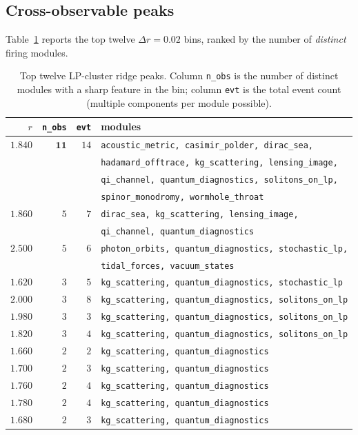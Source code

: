 \documentclass[11pt,letterpaper]{article}
\begin{document}
\subsection{Cross-observable peaks}\label{ssec:peaks}

Table~\ref{tab:peaks} reports the top twelve $\Delta r = 0.02$ bins, ranked by the number of \emph{distinct} firing modules.

\begin{table}[h]
\centering
\caption{Top twelve LP-cluster ridge peaks. Column \texttt{n\_obs} is the number of distinct modules with a sharp feature in the bin; column \texttt{evt} is the total event count (multiple components per module possible).}
\label{tab:peaks}
\begin{tabular}{rrrl}
\toprule
$r$ & \texttt{n\_obs} & \texttt{evt} & modules \\
\midrule
$1.840$ & $\mathbf{11}$ & $14$ & \texttt{acoustic\_metric, casimir\_polder, dirac\_sea,} \\
       &     &     & \texttt{hadamard\_offtrace, kg\_scattering, lensing\_image,} \\
       &     &     & \texttt{qi\_channel, quantum\_diagnostics, solitons\_on\_lp,} \\
       &     &     & \texttt{spinor\_monodromy, wormhole\_throat} \\
\midrule
$1.860$ & $5$ & $7$ & \texttt{dirac\_sea, kg\_scattering, lensing\_image,} \\
       &     &     & \texttt{qi\_channel, quantum\_diagnostics} \\
$2.500$ & $5$ & $6$ & \texttt{photon\_orbits, quantum\_diagnostics, stochastic\_lp,} \\
       &     &     & \texttt{tidal\_forces, vacuum\_states} \\
$1.620$ & $3$ & $5$ & \texttt{kg\_scattering, quantum\_diagnostics, stochastic\_lp} \\
$2.000$ & $3$ & $8$ & \texttt{kg\_scattering, quantum\_diagnostics, solitons\_on\_lp} \\
$1.980$ & $3$ & $3$ & \texttt{kg\_scattering, quantum\_diagnostics, solitons\_on\_lp} \\
$1.820$ & $3$ & $4$ & \texttt{kg\_scattering, quantum\_diagnostics, solitons\_on\_lp} \\
$1.660$ & $2$ & $2$ & \texttt{kg\_scattering, quantum\_diagnostics} \\
$1.700$ & $2$ & $3$ & \texttt{kg\_scattering, quantum\_diagnostics} \\
$1.760$ & $2$ & $4$ & \texttt{kg\_scattering, quantum\_diagnostics} \\
$1.780$ & $2$ & $4$ & \texttt{kg\_scattering, quantum\_diagnostics} \\
$1.680$ & $2$ & $3$ & \texttt{kg\_scattering, quantum\_diagnostics} \\
\bottomrule
\end{tabular}
\end{table}
\end{document}
